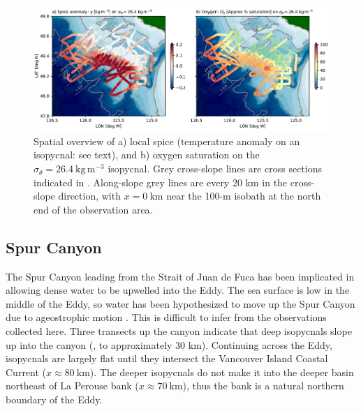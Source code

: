 \documentclass[draft]{agujournal2019}
\newcommand*{\Eddy}{{\sc Eddy}}
\begin{document}
\begin{figure}[htbp]
  \begin{center}
    \includegraphics[width=6.2in]{SpiceO2264}
    \caption{Spatial overview of a) local spice (temperature anomaly on an isopycnal: see text), and b) oxygen saturation on the $\sigma_{\theta} = 26.4\ \mathrm{kg\,m^{-3}}$ isopycnal.  Grey cross-slope lines are cross sections indicated in .  Along-slope grey lines are every 20 km in the cross-slope direction, with $x=0\ \mathrm{km}$ near the 100-m isobath at the north end of the observation area.
   \label{fig:SpiceO2264}
    }
  \end{center}
\end{figure}

\subsection{Spur Canyon}

The Spur Canyon leading from the Strait of Juan de Fuca has been implicated in allowing dense water to be upwelled into the \Eddy.  The sea surface is low in the middle of the \Eddy, so water has been hypothesized to move up the Spur Canyon due to ageostrophic motion \cite{weaverhsieh87,freelanddenman82}.  This is difficult to infer from the observations collected here.  Three transects up the canyon indicate that deep isopycnals slope up into the canyon (, to approximately 30 km).  Continuing across the \Eddy, isopycnals are largely flat until they intersect the Vancouver Island Coastal Current ($x\approx 80\ \mathrm{km}$).  The deeper isopycnals do not make it into the deeper basin northeast of La Perouse bank ($x\approx 70\ \mathrm{km}$),  thus the bank is a natural northern boundary of the \Eddy.
\end{document}
